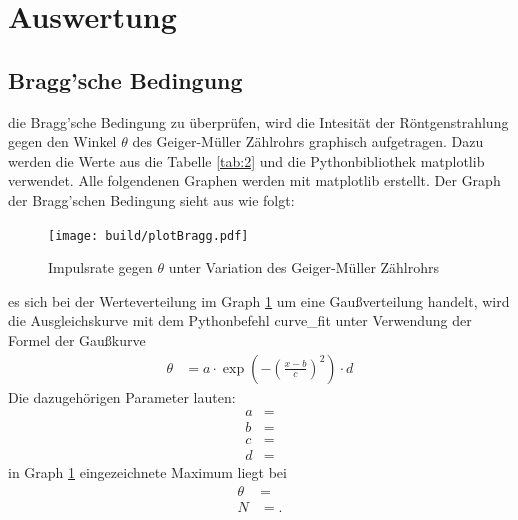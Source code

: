 \section{Auswertung}

\subsection{Bragg'sche Bedingung}

    \justifying die Bragg'sche Bedingung zu überprüfen, wird die Intesität der Röntgenstrahlung gegen den Winkel $\theta$ des
    Geiger-Müller Zählrohrs graphisch aufgetragen. Dazu werden die Werte aus die Tabelle \ref{tab:2} und die Pythonbibliothek matplotlib 
    \cite{matplotlib} verwendet. Alle folgendenen Graphen werden mit matplotlib erstellt. Der Graph der Bragg'schen Bedingung sieht aus wie
    folgt:

    \begin{figure}[H]
        \centering
        \texttt{[image: build/plotBragg.pdf]}
        \caption{Impulsrate gegen $\theta$ unter Variation des Geiger-Müller Zählrohrs}
        \label{fig:2}
    \end{figure}

    \justifying es sich bei der Werteverteilung im Graph \ref{fig:2} um eine Gaußverteilung handelt, wird die Ausgleichskurve 
    mit dem Pythonbefehl curve\_fit \cite{matplotlib} unter Verwendung der Formel der Gaußkurve
    \begin{align}
        \theta &= a\cdot \exp\left(-\left(\frac{x-b}{c}\right)^2\right)\cdot d \label{eq:8}
    \end{align}
    \justifying Die dazugehörigen Parameter lauten:
    \begin{subequations}\label{eq:9}
        \begin{align}
            a &= \text{} \label{eq:9a}\\
            b &= \text{} \label{eq:9b}\\
            c &= \text{} \label{eq:9c}\\
            d &= \text{} \label{eq:9d}
        \end{align}
    \end{subequations}
    \justifying in Graph \ref{fig:2} eingezeichnete Maximum liegt bei 
    \begin{subequations}\label{eq:10}
    \begin{align}
        \theta &= \text{} \label{eq:10a}\\
        N &= \text{}. \label{eq:10b}
    \end{align}
    \end{subequations}

